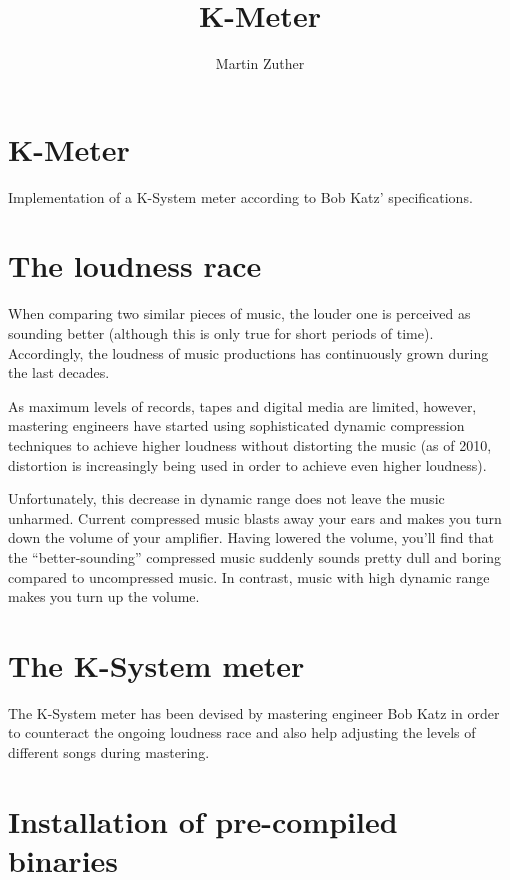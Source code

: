 


\title{K-Meter}
\author{Martin Zuther}

\usepackage[inner=18mm,outer=18mm,top=26mm,bottom=27mm,headsep=6.5mm,headheight=5mm]{geometry}

\DeclareRobustCommand*{\application}[1]{\texttt{#1}}



\section{K-Meter}

Implementation of a K-System meter according to Bob Katz' specifications.

\section{The loudness race}

When comparing two similar pieces of music, the louder one is
perceived as sounding better (although this is only true for short
periods of time).  Accordingly, the loudness of music productions has
continuously grown during the last decades.

As maximum levels of records, tapes and digital media are limited,
however, mastering engineers have started using sophisticated dynamic
compression techniques to achieve higher loudness without distorting
the music (as of 2010, distortion is increasingly being used in order
to achieve even higher loudness).

Unfortunately, this decrease in dynamic range does not leave the music
unharmed.  Current compressed music blasts away your ears and makes
you turn down the volume of your amplifier.  Having lowered the
volume, you’ll find that the “better-sounding” compressed music
suddenly sounds pretty dull and boring compared to uncompressed music.
In contrast, music with high dynamic range makes you turn up the
volume.

\section{The K-System meter}

The K-System meter has been devised by mastering engineer Bob Katz in
order to counteract the ongoing loudness race and also help adjusting
the levels of different songs during mastering.

\section{Installation of pre-compiled binaries}

